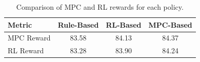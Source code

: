 \begin{table}[ht]
\centering
\begin{tabular}{lccc}
\hline
Metric & Rule-Based & RL-Based & MPC-Based \\
\hline
MPC Reward & 83.58 & 84.13 & 84.37 \\
RL Reward & 83.28 & 83.90 & 84.24 \\
\hline
\end{tabular}
\caption{Comparison of MPC and RL rewards for each policy.}
\label{tab:policy_rewards}
\end{table}
